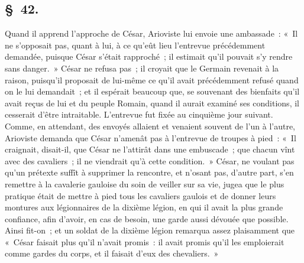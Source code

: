 \documentclass[french,twoside]{book} %
\begin{document}
\subsection[{§ 42.}]{ \textsc{§ 42.} }
\noindent Quand il apprend l’approche de César, Arioviste lui envoie une ambassade : « Il ne s’opposait pas, quant à lui, à ce qu’eût lieu l’entrevue précédemment demandée, puisque César s’était rapproché ; il estimait qu’il pouvait s’y rendre sans danger. » César ne refusa pas ; il croyait que le Germain revenait à la raison, puisqu’il proposait de lui-même ce qu’il avait précédemment refusé quand on le lui demandait ; et il espérait beaucoup que, se souvenant des bienfaits qu’il avait reçus de lui et du peuple Romain, quand il aurait examiné ses conditions, il cesserait d’être intraitable. L'entrevue fut fixée au cinquième jour suivant. Comme, en attendant, des envoyés allaient et venaient souvent de l’un à l’autre, Arioviste demanda que César n’amenât pas à l’entrevue de troupes à pied : « Il craignait, disait-il, que César ne l’attirât dans une embuscade ; que chacun vînt avec des cavaliers ; il ne viendrait qu’à cette condition. » César, ne voulant pas qu’un prétexte suffît à supprimer la rencontre, et n’osant pas, d’autre part, s’en remettre à la cavalerie gauloise du soin de veiller sur sa vie, jugea que le plus pratique était de mettre à pied tous les cavaliers gaulois et de donner leurs montures aux légionnaires de la dixième légion, en qui il avait la plus grande confiance, afin d’avoir, en cas de besoin, une garde aussi dévouée que possible. Ainsi fit-on ; et un soldat de la dixième légion remarqua assez plaisamment que « César faisait plus qu’il n’avait promis : il avait promis qu’il les emploierait comme gardes du corps, et il faisait d’eux des chevaliers. »
\end{document}
